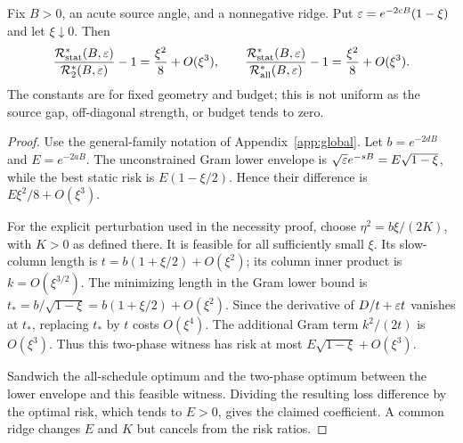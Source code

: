 \begin{corollary}\label{cor:near_boundary}
Fix $B>0$, an acute source angle, and a nonnegative ridge. Put $\varepsilon=e^{-2cB}(1-\xi)$ and let $\xi\downarrow0$. Then
\[
 \frac{\mathcal R_{\mathrm{stat}}^*(B,\varepsilon)}{\mathcal R_{2}^*(B,\varepsilon)}-1
 =\frac{\xi^2}{8}+O(\xi^3),\qquad
 \frac{\mathcal R_{\mathrm{stat}}^*(B,\varepsilon)}{\mathcal R_{\mathrm{all}}^*(B,\varepsilon)}-1
 =\frac{\xi^2}{8}+O(\xi^3).
\]
The constants are for fixed geometry and budget; this is not uniform as the source gap, off-diagonal strength, or budget tends to zero.
\end{corollary}
\begin{proof}
Use the general-family notation of Appendix~\ref{app:global}. Let $b=e^{-2dB}$ and $E=e^{-2aB}$. The unconstrained Gram lower envelope is
$\sqrt{\varepsilon} e^{-sB}=E\sqrt{1-\xi}$, while the best static risk is $E(1-\xi/2)$. Hence their difference is $E\xi^2/8+O(\xi^3)$.

For the explicit perturbation used in the necessity proof, choose
$\eta^2=b\xi/(2K)$, with $K>0$ as defined there. It is feasible for all sufficiently small $\xi$. Its slow-column length is
$t=b(1+\xi/2)+O(\xi^2)$; its column inner product is $k=O(\xi^{3/2})$. The minimizing length in the Gram lower bound is
$t_* = b/\sqrt{1-\xi}=b(1+\xi/2)+O(\xi^2)$. Since the derivative of $D/t+\varepsilon t$ vanishes at $t_*$, replacing $t_*$ by $t$ costs $O(\xi^4)$. The additional Gram term $k^2/(2t)$ is $O(\xi^3)$. Thus this two-phase witness has risk at most $E\sqrt{1-\xi}+O(\xi^3)$.

Sandwich the all-schedule optimum and the two-phase optimum between the lower envelope and this feasible witness. Dividing the resulting loss difference by the optimal risk, which tends to $E>0$, gives the claimed coefficient. A common ridge changes $E$ and $K$ but cancels from the risk ratios.
\end{proof}

